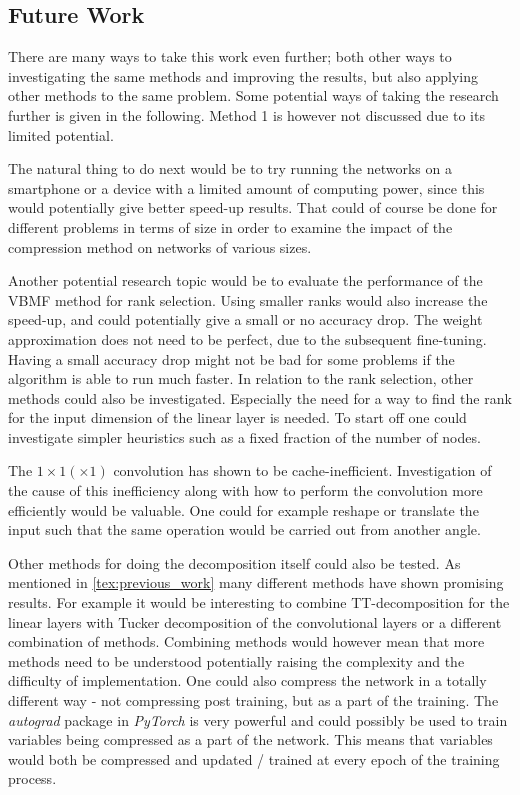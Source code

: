 \subsection{Future Work} \label{tex:future_work}
There are many ways to take this work even further; both other ways to investigating the same methods and improving the results, but also applying other methods to the same problem. Some potential ways of taking the research further is given in the following. Method 1 is however not discussed due to its limited potential.

The natural thing to do next would be to try running the networks on a smartphone or a device with a limited amount of computing power, since this would potentially give better speed-up results. That could of course be done for different problems in terms of size in order to examine the impact of the compression method on networks of various sizes.

Another potential research topic would be to evaluate the performance of the VBMF method for rank selection. Using smaller ranks would also increase the speed-up, and could potentially give a small or no accuracy drop. The weight approximation does not need to be perfect, due to the subsequent fine-tuning. Having a small accuracy drop might not be bad for some problems if the algorithm is able to run much faster. In relation to the rank selection, other methods could also be investigated. Especially the need for a way to find the rank for the input dimension of the linear layer is needed. To start off one could investigate simpler heuristics such as a fixed fraction of the number of nodes.

The $1\times 1 (\times 1)$ convolution has shown to be cache-inefficient. Investigation of the cause of this inefficiency along with how to perform the convolution more efficiently would be valuable. One could for example reshape or translate the input such that the same operation would be carried out from another angle. 

Other methods for doing the decomposition itself could also be tested. As mentioned in \autoref{tex:previous_work} many different methods have shown promising results. For example it would be interesting to combine TT-decomposition for the linear layers with Tucker decomposition of the convolutional layers or a different combination of methods. Combining methods would however mean that more methods need to be understood potentially raising the complexity and the difficulty of implementation. One could also compress the network in a totally different way - not compressing post training, but as a part of the training. The \textit{autograd} package in \textit{PyTorch} is very powerful and could possibly be used to train variables being compressed as a part of the network. This means that variables would both be compressed and updated / trained at every epoch of the training process.